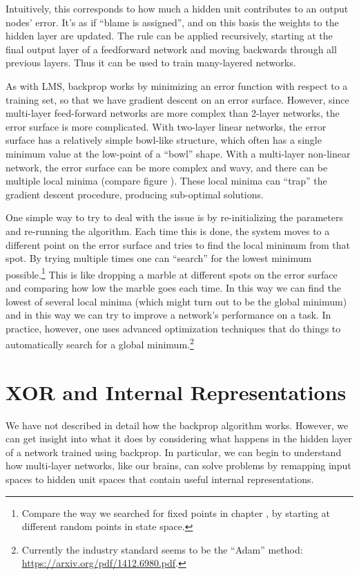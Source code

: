 Intuitively, this corresponds to how much a  hidden unit contributes to an output nodes' error. It's as if ``blame is assigned'', and on this basis the weights to the hidden layer are updated. The rule can be applied recursively, starting at the final output layer of a feedforward network and moving backwards through all previous layers. Thus it can be used to train many-layered networks. 

As with LMS, backprop works by minimizing an error function with respect to a training set, so that we have gradient descent on an error surface. However, since multi-layer feed-forward networks are more complex than 2-layer networks, the error surface is more complicated. With two-layer linear networks, the error surface has a relatively simple bowl-like structure, which often has a single minimum value at the low-point of a ``bowl'' shape. With a multi-layer non-linear network, the error surface can be more complex and wavy, and there can be multiple local minima (compare figure ). These local minima can ``trap'' the gradient descent procedure, producing sub-optimal solutions.

One simple way to try to deal with the issue is by re-initializing the parameters and re-running the algorithm. Each time this is done, the system moves to a different point on the error surface and tries to find the local minimum from that spot. By trying multiple times one can ``search'' for the lowest minimum possible.\footnote{Compare the way we searched for fixed points in chapter , by starting at different random points in state space.}  This is like dropping a marble at different spots on the error surface and comparing how low the marble goes each time. In this way we can find the lowest of several local minima (which might turn out to be the global minimum) and in this way we can try to improve a network's performance on a task. In practice, however, one uses advanced optimization techniques that do things to automatically search for a global minimum.\footnote{Currently the industry standard seems to be the ``Adam'' method: \url{https://arxiv.org/pdf/1412.6980.pdf}.}

\section{XOR and Internal Representations}\label{sect_xor_remap}

We have not described in detail how the backprop algorithm works. However, we can get insight into what it does by considering what happens in the hidden layer of a network trained using backprop. In particular, we can begin to understand how multi-layer networks, like our brains, can solve problems by remapping input spaces to hidden unit spaces that contain useful internal representations. 

